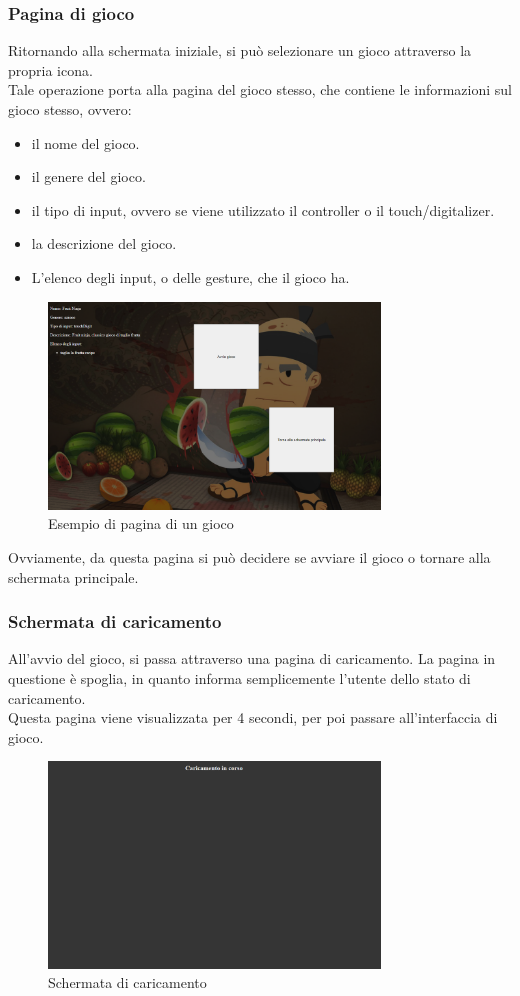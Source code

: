 \subsubsection{Pagina di gioco}
Ritornando alla schermata iniziale, si può selezionare un gioco attraverso la propria icona.\\
Tale operazione porta alla pagina del gioco stesso, che contiene le informazioni sul gioco stesso, ovvero:
\begin{itemize}
    \item il nome del gioco.
    \item il genere del gioco.
    \item il tipo di input, ovvero se viene utilizzato il controller o il touch/digitalizer.
    \item la descrizione del gioco.
    \item L'elenco degli input, o delle gesture, che il gioco ha.
\end{itemize}
\begin{figure}[h]
    \centering
    \includegraphics[width=250pt]{images/product/schermataPaginaGioco.png}
    \caption{Esempio di pagina di un gioco}
    \label{fig:schermataPaginaGioco}
\end{figure}
Ovviamente, da questa pagina si può decidere se avviare il gioco o tornare alla schermata principale.
\subsubsection{Schermata di caricamento}
All'avvio del gioco, si passa attraverso una pagina di caricamento. La pagina in questione è spoglia, in quanto informa semplicemente l'utente dello stato di caricamento.\\
Questa pagina viene visualizzata per 4 secondi, per poi passare all'interfaccia di gioco.
\begin{figure}[h]
    \centering
    \includegraphics[width=250pt]{images/product/schermataCaricamento.png}
    \caption{Schermata di caricamento}
    \label{fig:schermataCaricamento}
\end{figure}

